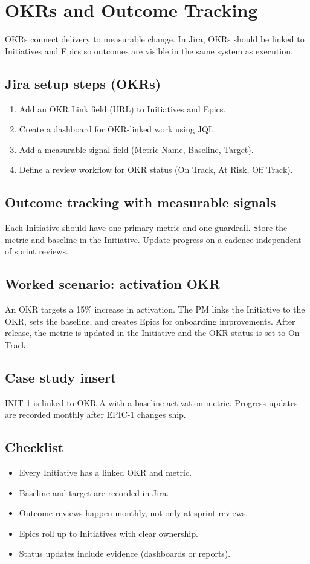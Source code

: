 \section{OKRs and Outcome Tracking}
OKRs connect delivery to measurable change. In Jira, OKRs should be linked to Initiatives and Epics so outcomes are visible in the same system as execution.

\subsection{Jira setup steps (OKRs)}
\begin{enumerate}
  \item Add an OKR Link field (URL) to Initiatives and Epics.
  \item Create a dashboard for OKR-linked work using JQL.
  \item Add a measurable signal field (Metric Name, Baseline, Target).
  \item Define a review workflow for OKR status (On Track, At Risk, Off Track).
\end{enumerate}

\subsection{Outcome tracking with measurable signals}
Each Initiative should have one primary metric and one guardrail. Store the metric and baseline in the Initiative. Update progress on a cadence independent of sprint reviews.

\subsection{Worked scenario: activation OKR}
An OKR targets a 15\% increase in activation. The PM links the Initiative to the OKR, sets the baseline, and creates Epics for onboarding improvements. After release, the metric is updated in the Initiative and the OKR status is set to On Track.

\subsection{Case study insert}
INIT-1 is linked to OKR-A with a baseline activation metric. Progress updates are recorded monthly after EPIC-1 changes ship.
\subsection{Checklist}
\begin{itemize}
  \item Every Initiative has a linked OKR and metric.
  \item Baseline and target are recorded in Jira.
  \item Outcome reviews happen monthly, not only at sprint reviews.
  \item Epics roll up to Initiatives with clear ownership.
  \item Status updates include evidence (dashboards or reports).
\end{itemize}

